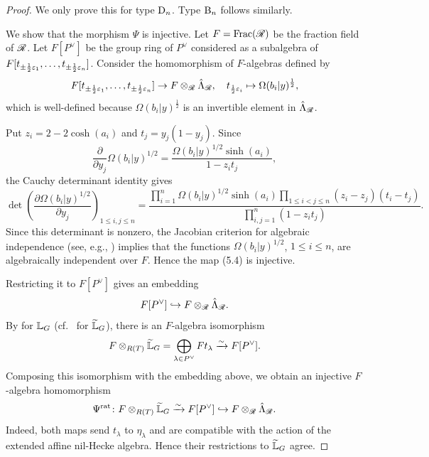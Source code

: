 \documentclass[a4paper]{amsart}
\newcommand{\ike}[1]{\todo[size=\tiny,color=blue!30]{#1}}
\theoremstyle{remark}
\numberwithin{equation}{section}
\begin{document}
\begin{proof}
We only prove this for type $\mathrm{D}_{n}$. Type $\mathrm{B}_{n}$ follows similarly. 

We show that the morphism $\Psi$ is injective. 
Let $F=\mathrm{Frac}(\mathscr{R})$ be the fraction field of $\mathscr{R}$.
Let $F[P^\lor]$ be the group ring of $P^\lor$ considered as 
a subalgebra of $F[t_{\pm \frac{1}{2}\varepsilon_1},\ldots,t_{\pm \frac{1}{2}\varepsilon_n}]$.
Consider the homomorphism of $F$-algebras defined by 
\begin{equation}
F[t_{\pm \frac{1}{2}\varepsilon_1},\ldots,t_{\pm \frac{1}{2}\varepsilon_n}]
\rightarrow F\otimes_{\mathscr{R}}\hat{\Lambda}_{\mathscr{R}},\quad 
t_{\frac{1}{2}\varepsilon_i} \mapsto 
\Omega(b_i| y)^{\frac{1}{2}},\label{eq:Laurent_map}
\end{equation}
which is well-defined because  
$\Omega(b_i| y)^{\frac{1}{2}}$ is an invertible
element in $\hat{\Lambda}_{\mathscr{R}}$. 

Put $z_i=2-2\cosh(a_i)$ and
$t_j=y_j(1-y_j)$. Since
\[
\frac{\partial}{\partial y_j}
\Omega(b_i| y)^{1/2}
=
\frac{\Omega(b_i| y)^{1/2}\sinh(a_i)}
{1-z_it_j},
\]
the Cauchy determinant identity gives
\[
\det\left(
\frac{\partial\Omega(b_i| y)^{1/2}}
{\partial y_j}
\right)_{1\le i,j\le n}
=
\frac{
\displaystyle
\prod_{i=1}^n
\Omega(b_i| y)^{1/2}\sinh(a_i)
\prod_{1\le i<j\le n}
(z_i-z_j)(t_i-t_j)
}{
\displaystyle
\prod_{i,j=1}^n(1-z_it_j)
}.
\]
Since this determinant is nonzero, the Jacobian criterion for algebraic independence (see, e.g., \cite{Matsumura}) implies that the functions \(\Omega(b_i| y)^{1/2}\), \(1\leq i\leq n\), are algebraically independent over \(F\). Hence the map (5.4) is injective.



Restricting it to
\(F[P^\lor]\) gives an embedding
\[
F[P^\lor]\hookrightarrow F\otimes_{\mathscr{R}}\hat{\Lambda}_{\mathscr{R}}.
\]
By \cite[Lemma~5.2]{LSS:K} for \(\mathbb{L}_G\)
(cf.\ \cite[Lemma~2.14]{ISY} for \(\widetilde{\mathbb{L}}_G\)), there is an
\(F\)-algebra isomorphism
\[
F\otimes_{R(T)}\widetilde{\mathbb{L}}_G
=
\bigoplus_{\lambda\in P^\lor}Ft_\lambda
\xrightarrow{\sim}
F[P^\lor].
\]
Composing this isomorphism with the embedding above, we obtain an
injective \(F\)-algebra homomorphism
\[
\Psi^{\mathrm{rat}}\colon
F\otimes_{R(T)}\widetilde{\mathbb{L}}_G
\xrightarrow{\sim}
F[P^\lor]
\hookrightarrow
F\otimes_{\mathscr{R}}\hat{\Lambda}_{\mathscr{R}}.
\]
Indeed, both maps send $t_\lambda$ to
$\eta_\lambda$ and are compatible with
the action of the extended affine nil-Hecke
algebra. Hence their restrictions to
$\widetilde{\mathbb{L}}_G$ agree.


\end{proof}
\end{document}
